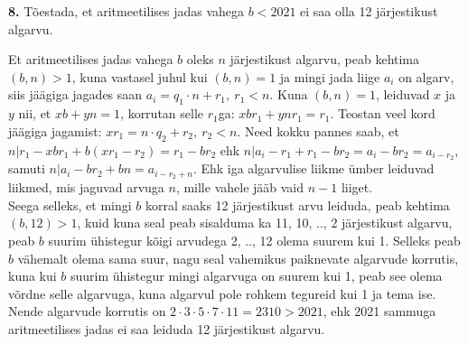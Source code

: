 \documentclass[a4paper, 10pt]{article}
\begin{document}
\bigskip

\noindent \textbf{8.} Tõestada, et aritmeetilises jadas vahega $b<2021$ ei saa olla 12 järjestikust algarvu. 

\bigskip

Et aritmeetilises jadas vahega $b$ oleks $n$ järjestikust algarvu, peab kehtima $(b,n)>1$, kuna vastasel juhul kui $(b,n)=1$ ja mingi jada liige $a_i$ on algarv, siis jäägiga jagades saan $a_i=q_1\cdot n+r_1,\ r_1<n$. Kuna $(b,n)=1$, leiduvad $x$ ja $y$ nii, et $xb+yn=1$, korrutan selle $r_1$ga: $xbr_1+ynr_1=r_1$. Teostan veel kord jäägiga jagamist: $xr_1=n\cdot q_2+r_2,\ r_2<n$. Need kokku pannes saab, et $n|r_1-xbr_1+b(xr_1-r_2)=r_1-br_2$ ehk $n|a_i-r_1+r_1-br_2=a_i-br_2=a_{i-r_2}$, samuti $n|a_i-br_2+bn=a_{i-r_2+n}$. Ehk iga algarvulise liikme ümber leiduvad liikmed, mis jaguvad arvuga $n$, mille vahele jääb vaid $n-1$ liiget.\\
\indent Seega selleks, et mingi $b$ korral saaks 12 järjestikust arvu leiduda, peab kehtima $(b,12)>1$, kuid kuna seal peab sisalduma ka 11, 10, .., 2 järjestikust algarvu, peab $b$ suurim ühistegur kõigi arvudega 2, .., 12 olema suurem kui 1. Selleks peab $b$ vähemalt olema sama suur, nagu seal vahemikus paiknevate algarvude korrutis, kuna kui $b$ suurim ühistegur mingi algarvuga on suurem kui 1, peab see olema võrdne selle algarvuga, kuna algarvul pole rohkem tegureid kui 1 ja tema ise. Nende algarvude korrutis on $2\cdot3\cdot5\cdot7\cdot11=2310>2021$, ehk 2021 sammuga aritmeetilises jadas ei saa leiduda 12 järjestikust algarvu.
\end{document}
